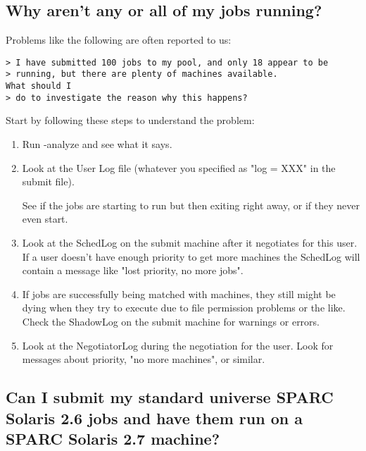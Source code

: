 
\subsection{Why aren't any or all of my jobs running?}

Problems like the following are often reported to us:

\begin{verbatim}
> I have submitted 100 jobs to my pool, and only 18 appear to be
> running, but there are plenty of machines available.
What should I
> do to investigate the reason why this happens?
\end{verbatim}

Start by following these steps to understand the problem:

\begin{enumerate}

\item Run  -analyze and see what it says.

\item Look at the User Log file (whatever you specified as "log = XXX"
in the submit file).

See if the jobs are starting to run but then exiting right away, or if
they never even start.

\item Look at the SchedLog on the submit machine after it negotiates
for this user.
If a user doesn't have enough priority to get more machines the
SchedLog will contain a message like "lost priority, no more jobs".

\item If jobs are successfully being matched with machines, they
still might be dying when they try to execute due to file permission
problems or the like.
Check the ShadowLog on the submit machine for warnings or errors.

\item Look at the NegotiatorLog during the negotiation for the user.
Look for messages about priority, "no more machines", or similar.

\end{enumerate}

\subsection{Can I submit my standard universe SPARC Solaris 2.6 jobs
and have them run on a SPARC Solaris 2.7 machine?}

